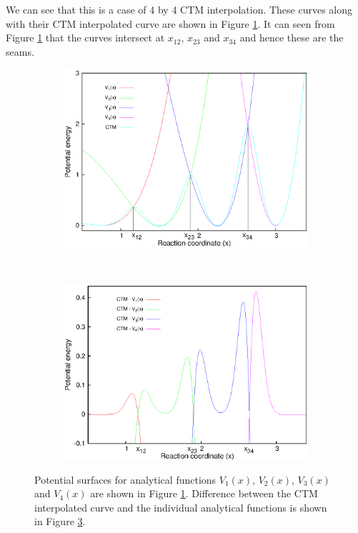 We can see that this is a case of 4 by 4 CTM interpolation. These curves along with their CTM
interpolated curve are shown in Figure \ref{4by4PES}. It can seen from Figure \ref{4by4PES} that the
curves intersect at $x_{12}$, $x_{23}$ and $x_{34}$ and hence these are the seams.

\begin{figure}[hbt!]
    \centering
    \begin{subfigure}[t]{0.5\textwidth}
        \centering
        \includegraphics[width=1\textwidth]{figures/potentialsGraph.eps}
        \caption{\label{4by4PES}}
    \end{subfigure}%
    ~
    \begin{subfigure}[t]{0.5\textwidth}
        \centering
        \includegraphics[width=1\textwidth]{figures/diffGraph.eps}
        \caption{\label{4by4Diff}}
    \end{subfigure}
    \caption{Potential surfaces for analytical functions $V_{1}(x)$, $V_{2}(x)$, $V_{3}(x)$ and
    $V_{4}(x)$ are shown in Figure \ref{4by4PES}. Difference between the CTM interpolated curve
    and the individual analytical functions is shown in Figure \ref{4by4Diff}.}
\end{figure}


